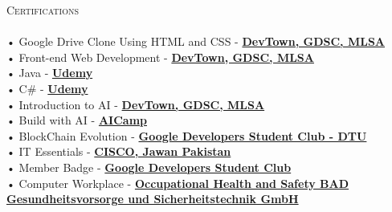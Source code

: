 \documentclass[a4paper]{article}
\newcommand{\lineunder} {
    \vspace*{-8pt} \\
    \hspace*{-18pt} \hrulefill \\
}
\newcommand{\header} [1] {
    {\hspace*{-18pt}\vspace*{6pt} \textsc{#1}}
    \vspace*{-6pt} \lineunder
}
\begin{document}
      \header{Certifications}
      \vspace{2mm}
      • Google Drive Clone Using HTML and CSS - \textbf{\href{https://cert.devtown.in/verify/ZfQgMV}{DevTown, GDSC, MLSA}}\\
\vspace*{1mm}
      • Front-end Web Development - \textbf{\href{https://cert.devtown.in/verify/2cRv4D}{DevTown, GDSC, MLSA}}\\
\vspace*{1mm}
      • Java - \textbf{\href{https://www.udemy.com/certificate/UC-2b632316-fd78-47b0-af3a-ab4bf29c41c6/}{Udemy}}\\
\vspace*{1mm}
      • C\# - \textbf{\href{https://www.udemy.com/certificate/UC-74a53bdb-8ca9-467d-9dba-ba37d639299f/}{Udemy}}\\
\vspace*{1mm}
      • Introduction to AI - \textbf{\href{https://cert.devtown.in/verify/1xgEdU}{DevTown, GDSC, MLSA}}\\
\vspace*{1mm}
      • Build with AI - \textbf{\href{https://www.aicamp.ai/index/certificate/W202405100903rora}{AICamp}}\\
\vspace*{1mm}
      • BlockChain Evolution - \textbf{\href{https://certificate.givemycertificate.com/c/d0618275-fb03-4bb8-bee3-04b58fedb757}{Google Developers Student Club - DTU}}\\
\vspace*{1mm}
      • IT Essentials - \textbf{\href{https://www.credly.com/badges/11065f1c-e19b-471f-a32e-351552ea93ea/public\_url}{CISCO, Jawan Pakistan}}\\
\vspace*{1mm}
      • Member Badge - \textbf{\href{https://developers.google.com/profile/badges/community/gdsc/2023/member}{Google Developers Student Club}}\\
\vspace*{1mm}
      • Computer Workplace - \textbf{\href{https://www.linkedin.com/in/rohanraaj2/details/certifications/1728504916868/single-media-viewer?type=DOCUMENT\&profileId=ACoAAAXBhjEB1wBZO3Eb5Nhljme8rY91vG10w5M\&lipi=urn\%3Ali\%3Apage\%3Ad\_flagship3\_profile\_view\_base\_certifications\_details\%3B7i06Op1FQLybklu9D8yAyQ\%3D\%3D}{Occupational Health and Safety BAD Gesundheitsvorsorge und Sicherheitstechnik GmbH}}\\
\vspace*{1mm}
      \vspace{2mm}



    \ 
    
\end{document}
